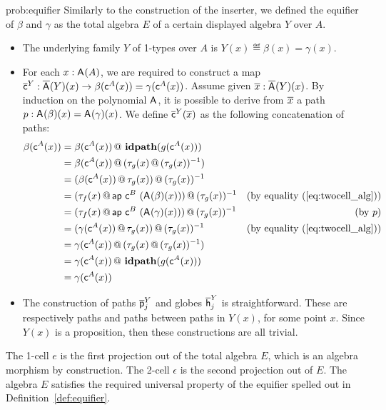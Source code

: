 \begin{construction}{prob:equifier}\label{cons:equifier}
Similarly to the construction of the inserter, we defined the equifier
of $\beta$ and $\gamma$ as the total algebra $E$ of a certain
displayed algebra $Y$ over $A$.
\begin{itemize}
\item The underlying family $Y$ of 1-types over $A$ is $Y(x) \eqdef \beta(x) = \gamma(x)$.
\item
For each $x : \mathsf{A}^{}(A)$, we are required to construct
a map $\overline{\mathsf{c}}^{Y} : \overline{\mathsf{A}^{}}(Y)(x) \rightarrow
\beta(\mathsf{c}^{A}(x)) = \gamma (\mathsf{c}^{A}(x))$. Assume given $\overline{x}
: \overline{\mathsf{A}^{}}(Y)(x)$. By induction on the polynomial
$\mathsf{A}^{}$, it is possible to derive from $\overline{x}$ a path $p
: \mathsf{A}^{}(\beta)(x) = \mathsf{A}^{}(\gamma)(x)$.  We
define $\overline{\mathsf{c}}^{Y}(\overline{x})$ as the following concatenation of
paths:
\begin{align*}
\beta(\mathsf{c}^{A}(x))
&= \beta(\mathsf{c}^{A}(x)) \, @ \, \operatorname{\mathbf{idpath}}(g(\mathsf{c}^{A}(x))) \\
&= \beta(\mathsf{c}^{A}(x)) \, @ \, (\tau_g(x) \, @ \, (\tau_g(x))^{-1}) \\
&= (\beta(\mathsf{c}^{A}(x)) \, @ \, \tau_g(x)) \, @ \, (\tau_g(x))^{-1} \\
&= (\tau_f(x) \, @ \, \mathsf{ap} \ \mathsf{c}^{B} \ (\mathsf{A}^{}(\beta)(x))) \, @ \, (\tau_g(x))^{-1}
& \text{(by equality~(\ref{eq:twocell_alg}))}\\
&= (\tau_f(x) \, @ \, \mathsf{ap} \ \mathsf{c}^{B} \ (\mathsf{A}^{}(\gamma)(x))) \, @ \, (\tau_g(x))^{-1}
& \text{(by $p$)}\\
&= (\gamma(\mathsf{c}^{A}(x)) \, @ \, \tau_g(x)) \, @ \, (\tau_g(x))^{-1}
& \text{(by equality~(\ref{eq:twocell_alg}))}\\
&= \gamma(\mathsf{c}^{A}(x)) \, @ \, (\tau_g(x) \, @ \, (\tau_g(x))^{-1}) \\
&= \gamma(\mathsf{c}^{A}(x)) \, @ \, \operatorname{\mathbf{idpath}}(g(\mathsf{c}^{A}(x))) \\
&= \gamma(\mathsf{c}^{A}(x))
\end{align*}
\item The construction of paths $\overline{\mathsf{p}}^{Y}_{j}$ and globes $\overline{\mathsf{h}}^{Y}_{j}$ is
straightforward. These are respectively paths and paths between paths
in $Y(x)$, for some point $x$. Since $Y(x)$ is a proposition, then
these constructions are all trivial.
\end{itemize}

The 1-cell $e$ is the first projection out of the total algebra $E$, which
is an algebra morphism by construction. The 2-cell $\epsilon$ is the
second projection out of $E$. The algebra $E$ satisfies the required
universal property of the equifier spelled out in Definition~\ref{def:equifier}.

\end{construction}
